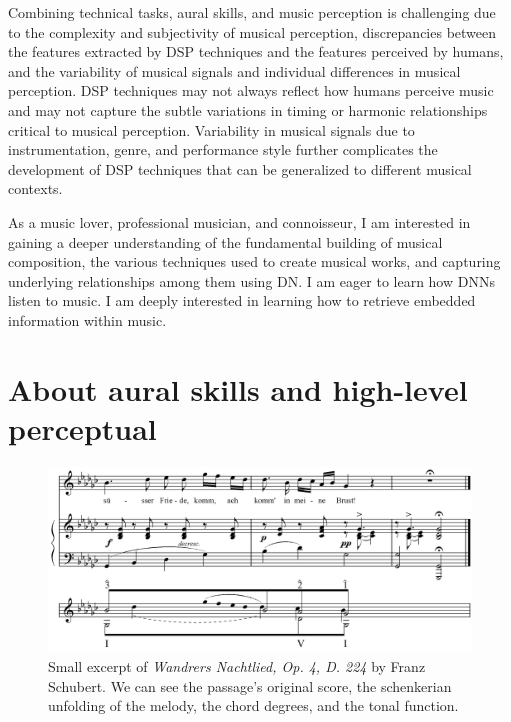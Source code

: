Combining technical tasks, aural skills, and music perception is challenging due to the complexity and subjectivity of musical perception, discrepancies between the features extracted by DSP techniques and the features perceived by humans, and the variability of musical signals and individual differences in musical perception. DSP techniques may not always reflect how humans perceive music and may not capture the subtle variations in timing or harmonic relationships critical to musical perception. Variability in musical signals due to instrumentation, genre, and performance style further complicates the development of DSP techniques that can be generalized to different musical contexts.

As a music lover, professional musician, and connoisseur, I am interested in gaining a deeper understanding of the fundamental building of musical composition, the various techniques used to create musical works, and capturing underlying relationships among them using DN.  I am eager to learn how DNNs listen to music. I am deeply interested in learning how to retrieve embedded information within music. 

\section{About aural skills and high-level perceptual}


\begin{figure}[!ht]
\includegraphics[clip,width=\columnwidth]{figures/schenkerian analysis/SchubertOp4no3.png}%
\caption{Small excerpt of \textit{Wandrers Nachtlied, Op. 4, D. 224} by Franz Schubert. We can see the passage's original score, the schenkerian unfolding of the melody, the chord degrees, and the tonal function.}
\label{fig:timeseries}
\end{figure}


